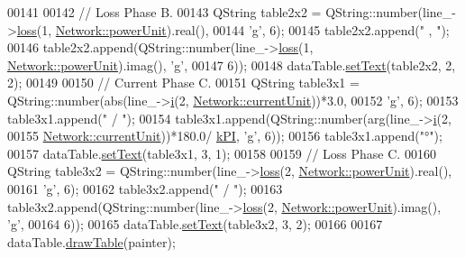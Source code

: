 \begin{DoxyCode}
00141 
00142   \textcolor{comment}{// Loss Phase B.}
00143   QString table2x2 = QString::number(line\_->\hyperlink{group___models_ga511d4e89d613d4f222480476f2da3abe}{loss}(1, \hyperlink{group___models_ga9504015bc566f4a3d3b4d4a86000293b}{Network::powerUnit}).real(),
00144                                      \textcolor{charliteral}{'g'}, 6);
00145   table2x2.append(\textcolor{stringliteral}{" , "});
00146   table2x2.append(QString::number(line\_->\hyperlink{group___models_ga511d4e89d613d4f222480476f2da3abe}{loss}(1, \hyperlink{group___models_ga9504015bc566f4a3d3b4d4a86000293b}{Network::powerUnit}).imag(), \textcolor{charliteral}{'g'},
00147                                   6));
00148   dataTable.\hyperlink{class_data_table_aee0d28c77116b51360f0124a529cb3ff}{setText}(table2x2, 2, 2);
00149 
00150   \textcolor{comment}{// Current Phase C.}
00151   QString table3x1 = QString::number(abs(line\_->\hyperlink{group___models_ga2ad899adaa4f2e25b38c58e076db94ea}{i}(2, \hyperlink{group___models_gac6a26db5fef2b1dd2a00faf6340d1702}{Network::currentUnit}))*3.0,
00152                                      \textcolor{charliteral}{'g'}, 6);
00153   table3x1.append(\textcolor{stringliteral}{" / "});
00154   table3x1.append(QString::number(arg(line\_->\hyperlink{group___models_ga2ad899adaa4f2e25b38c58e076db94ea}{i}(2,
00155                                       \hyperlink{group___models_gac6a26db5fef2b1dd2a00faf6340d1702}{Network::currentUnit}))*180.0/
      \hyperlink{math__constants_8h_a368d99984512d9a6c6f18b37b4446431}{kPI}, \textcolor{charliteral}{'g'}, 6));
00156   table3x1.append(\textcolor{stringliteral}{"°"});
00157   dataTable.\hyperlink{class_data_table_aee0d28c77116b51360f0124a529cb3ff}{setText}(table3x1, 3, 1);
00158 
00159   \textcolor{comment}{// Loss Phase C.}
00160   QString table3x2 = QString::number(line\_->\hyperlink{group___models_ga511d4e89d613d4f222480476f2da3abe}{loss}(2, \hyperlink{group___models_ga9504015bc566f4a3d3b4d4a86000293b}{Network::powerUnit}).real(),
00161                                      \textcolor{charliteral}{'g'}, 6);
00162   table3x2.append(\textcolor{stringliteral}{" / "});
00163   table3x2.append(QString::number(line\_->\hyperlink{group___models_ga511d4e89d613d4f222480476f2da3abe}{loss}(2, \hyperlink{group___models_ga9504015bc566f4a3d3b4d4a86000293b}{Network::powerUnit}).imag(), \textcolor{charliteral}{'g'},
00164                                   6));
00165   dataTable.\hyperlink{class_data_table_aee0d28c77116b51360f0124a529cb3ff}{setText}(table3x2, 3, 2);
00166 
00167   dataTable.\hyperlink{class_data_table_a3a3695e88dcd4d4aad5cc941ec7e6e55}{drawTable}(painter);

\end{DoxyCode}
